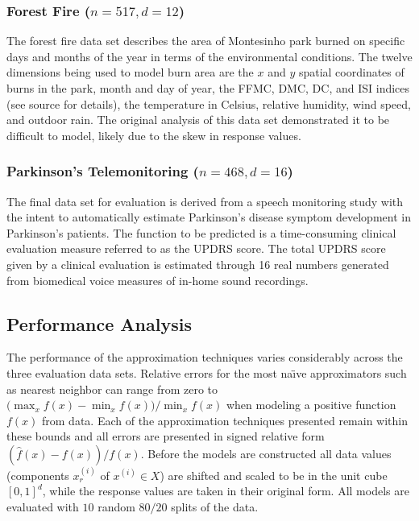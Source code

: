 \subsubsection{Forest Fire ($n = 517, d = 12$)}
The forest fire data set \cite{cortez2007data} describes the area of Montesinho park burned on specific days and months of the year in terms of the environmental conditions. The twelve dimensions being used to model burn area are the $x$ and $y$ spatial coordinates of burns in the park, month and day of year, the FFMC, DMC, DC, and ISI indices (see source for details), the temperature in Celsius, relative humidity, wind speed, and outdoor rain. The original analysis of this data set demonstrated it to be difficult to model, likely due to the skew in response values.

\subsubsection{Parkinson's Telemonitoring ($n = 468, d = 16$)}
The final data set for evaluation \cite{tsanas2010accurate} is derived from a speech monitoring study with the intent to automatically estimate Parkinson's disease symptom development in Parkinson's patients. The function to be predicted is a time-consuming clinical evaluation measure referred to as the UPDRS score. The total UPDRS score given by a clinical evaluation is estimated through 16 real numbers generated from biomedical voice measures of in-home sound recordings.

\subsection{Performance Analysis}
\label{sec_performance_analysis}

The performance of the approximation techniques varies considerably across the three evaluation data sets. Relative errors for the most na\"{\i}ve approximators such as nearest neighbor can range from zero to $\displaystyle \big(\max_x f(x) - \min_x f(x)\big) / \min_x f(x)$ when modeling a positive function $f(x)$ from data. Each of the approximation techniques presented remain within these bounds and all errors are presented in signed relative form $(\hat f(x) - f(x)) / f(x)$. Before the models are constructed all data values (components $x^{(i)}_r$ of $x^{(i)} \in X$) are shifted and scaled to be in the unit cube $[0,1]^d$, while the response values are taken in their original form. All models are evaluated with $10$ random $80/20$ splits of the data.


